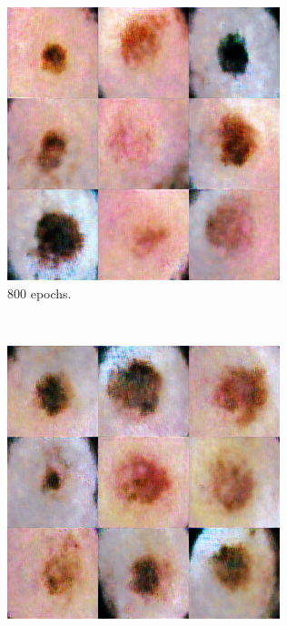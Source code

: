 \documentclass[conference]{IEEEtran}
\begin{document}
\begin{figure}
    \begin{subfigure}[b]{0.15\textwidth}
        \includegraphics[width=\textwidth]{7.png}
        \caption{800 epochs.}
        \label{fig:4}
    \end{subfigure}
  ~
    \begin{subfigure}[b]{0.15\textwidth}
        \includegraphics[width=\textwidth]{8.png}

\end{subfigure}
\end{figure}
\end{document}
